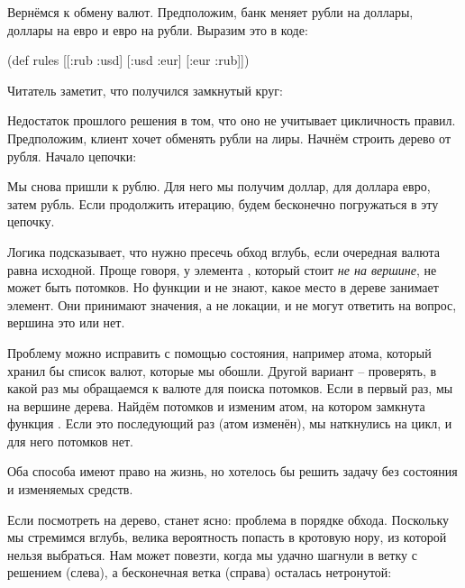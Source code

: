 Вернёмся к обмену валют. Предположим, банк меняет рубли на доллары, доллары на
евро и евро на рубли. Выразим это в коде:

\begin{english}
  \begin{clojure}
(def rules
  [[:rub :usd]
   [:usd :eur]
   [:eur :rub]])
  \end{clojure}
\end{english}

Читатель заметит, что получился замкнутый круг:

\begin{figure}[H]
  \centering
  
  \label{fig:chart-zip-18}
\end{figure}

Недостаток прошлого решения в том, что оно не учитывает цикличность
правил. Предположим, клиент хочет обменять рубли на лиры. Начнём строить дерево
от рубля. Начало цепочки:

\begin{figure}[H]
  \centering
  
  \label{fig:chart-zip-19}
\end{figure}

Мы снова пришли к рублю. Для него мы получим доллар, для доллара евро, затем
рубль. Если продолжить итерацию, будем бесконечно погружаться в эту цепочку.

Логика подсказывает, что нужно пресечь обход вглубь, если очередная валюта равна
исходной. Проще говоря, у элемента , который стоит \emph{не на вершине}, не
может быть потомков. Но функции  и  не знают, какое
место в дереве занимает элемент. Они принимают значения, а не локации, и не
могут ответить на вопрос, вершина это или нет.

Проблему можно исправить с помощью состояния, например атома, который хранил бы
список валют, которые мы обошли. Другой вариант – проверять, в какой раз мы
обращаемся к валюте  для поиска потомков. Если в первый раз, мы на вершине
дерева. Найдём потомков и изменим атом, на котором замкнута функция
. Если это последующий раз (атом изменён), мы наткнулись на цикл, и
для него потомков нет.

Оба способа имеют право на жизнь, но хотелось бы решить задачу без состояния и
изменяемых средств.

Если посмотреть на дерево, станет ясно: проблема в порядке обхода. Поскольку мы
стремимся вглубь, велика вероятность попасть в кротовую нору, из которой нельзя
выбраться. Нам может повезти, когда мы удачно шагнули в ветку с решением
(слева), а бесконечная ветка (справа) осталась нетронутой:

